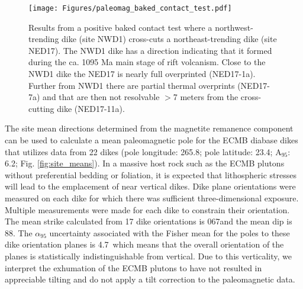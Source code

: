 \documentclass[draft]{agujournal2019}
\begin{document}
\begin{figure}[!ht]
\noindent\texttt{[image: Figures/paleomag\_baked\_contact\_test.pdf]}
\caption{\small{Results from a positive baked contact test where a northwest-trending dike (site NWD1) cross-cuts a northeast-trending dike (site NED17). The NWD1 dike has a direction indicating that it formed during the ca. 1095 Ma main stage of rift volcanism. Close to the NWD1 dike the NED17 is nearly full overprinted (NED17-1a). Further from NWD1 there are partial thermal overprints (NED17-7a) and that are then not resolvable $>$7 meters from the cross-cutting dike (NED17-11a).}}
\label{fig:baked_contact}
\end{figure}

The site mean directions determined from the magnetite remanence component can be used to calculate a mean paleomagnetic pole for the ECMB diabase dikes that utilizes data from 22 dikes (pole longitude: 265.8; pole latitude: 23.4; A$_{95}$: 6.2; Fig. \ref{fig:site_means}). In a massive host rock such as the ECMB plutons without preferential bedding or foliation, it is expected that lithospheric stresses will lead to the emplacement of near vertical dikes. Dike plane orientations were measured on each dike for which there was sufficient three-dimensional exposure. Multiple measurements were made for each dike to constrain their orientation. The mean strike calculated from 17 dike orientations is 067\textdegree and the mean dip is 88\textdegree. The $\alpha_{95}$ uncertainty associated with the Fisher mean for the poles to these dike orientation planes is 4.7\textdegree\ which means that the overall orientation of the planes is statistically indistinguishable from vertical. Due to this verticality, we interpret the exhumation of the ECMB plutons to have not resulted in appreciable tilting and do not apply a tilt correction to the paleomagnetic data.
\end{document}
